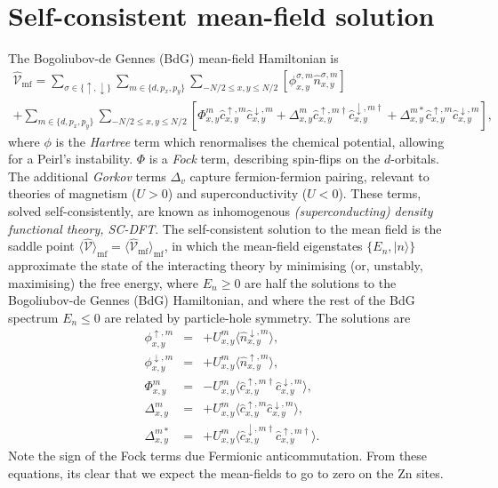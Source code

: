 \section{Self-consistent mean-field solution}
The Bogoliubov-de Gennes (BdG) mean-field Hamiltonian is
\begin{multline}
    \hat{\mathcal{V}}_\text{mf}=
        \sum_{\sigma\in\{\uparrow,\downarrow\}}\sum_{m\in\{d,p_x,p_y\}}\sum_{-N/2\leq x,y\leq N/2}\left[
    \phi_{x,y}^{\sigma,m}\hat{n}^{\sigma,m}_{ x,y }\right]
    \\
    +\sum_{m\in\{d,p_x,p_y\}}\sum_{-N/2\leq x,y\leq N/2}
    \left[
    \Phi_{x,y}^{m} \hat{c}^{ \uparrow,m }_{ x,y }\hat{c}^{ \downarrow,m }_{ x,y }
    +\Delta_{x,y}^{m} \hat{c}^{ \uparrow, m \dagger}_{ x,y }\hat{c}^{ \downarrow, m \dagger }_{ x,y }
    +\Delta_{x,y}^{m*} \hat{c}^{ \uparrow,m }_{ x,y }\hat{c}^{ \downarrow,m }_{ x,y }
    \right],
\end{multline}
where $\phi$ is the {\it Hartree} term which renormalises the chemical potential, allowing for a Peirl's instability. 
$\Phi$ is a {\it Fock} term, describing spin-flips on the $d$-orbitals.
The additional {\it Gorkov} terms $\Delta_v$ capture fermion-fermion pairing, relevant to theories of magnetism ($U>0$) and superconductivity ($U<0$).
These terms, solved self-consistently, are known as inhomogenous {\it (superconducting) density functional theory, SC-DFT}. 
The self-consistent solution to the mean field is the saddle point 
$\langle\hat{\mathcal{V}}\rangle_\text{mf} = \langle\hat{\mathcal{V}}_\text{mf}\rangle_\text{mf}$, in which the mean-field eigenstates $\{E_n,|n\rangle\}$ approximate the state of the interacting theory by minimising (or, unstably, maximising) the free energy, where $E_n\geq0$ are half the solutions to the Bogoliubov-de Gennes (BdG) Hamiltonian, and where the rest of the BdG spectrum $E_n\leq0$ are related by particle-hole symmetry.
The solutions are
\begin{eqnarray}
    \phi^{\uparrow,m}_{x,y} &=& +U^m_{x,y}\langle\hat{n}^{ \downarrow,m}_{ x,y }\rangle,\nonumber\\
    \phi^{\downarrow,m}_{x,y} &=& +U^m_{x,y}\langle\hat{n}^{ \uparrow,m}_{ x,y }\rangle,\nonumber\\
    \Phi^{m}_{x,y} &=& -U^m_{x,y}\langle\hat{c}^{ \uparrow,m \dagger }_{ x,y }\hat{c}^{ \downarrow,m }_{ x,y }\rangle,\nonumber\\
    \Delta^{m}_{x,y} &=& +U^m_{x,y}\langle\hat{c}^{ \uparrow,m }_{ x,y }\hat{c}^{ \downarrow,m }_{ x,y }\rangle,\nonumber\\
    \Delta^{m*}_{x,y} &=& +U^m_{x,y}\langle\hat{c}^{ \downarrow,m \dagger }_{ x,y }\hat{c}^{ \uparrow,m \dagger}_{ x,y }\rangle.
\end{eqnarray}
Note the sign of the Fock terms due Fermionic anticommutation.
From these equations, its clear that we expect the mean-fields to go to zero on the Zn sites.

